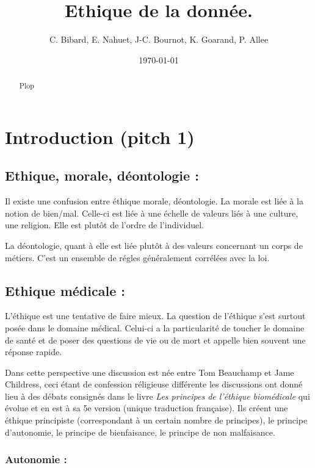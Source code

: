 \documentclass[a4paper,12pt]{article}
\title{Ethique de la donnée.}
\date{\today}
\author{C. Bibard, E. Nahuet, J-C. Bournot, K. Goarand, P. Allee}
\begin{document}
\maketitle

\begin{abstract}
Plop
\end{abstract}


\section{Introduction (pitch 1)}



\subsection{Ethique, morale, déontologie : }

Il existe une confusion entre éthique morale, déontologie. La morale est liée à la notion de bien/mal. Celle-ci est liée à une échelle de valeurs liés à une culture, une religion. Elle est plutôt de l'ordre de l'individuel. 

La déontologie, quant à elle est liée plutôt à des valeurs concernant un corps de métiers. C'est un ensemble de régles généralement corrélées avec la loi. 

\subsection{Ethique médicale :}

L'éthique est une tentative de faire mieux. La question de l'éthique s'est surtout posée dans le domaine médical. Celui-ci a la particularité de toucher le domaine de santé et de poser des questions de vie ou de mort et appelle bien souvent une réponse rapide. 

Dans cette perspective une discussion est née entre Tom Beauchamp et Jame Childress, ceci étant de confession réligieuse différente les discussions ont donné lieu à des débats consignés dans le livre \textit{Les principes de l'éthique biomédicale} qui évolue et en est à sa 5e version (unique traduction française).
Ils créent une éthique principiste (correspondant à un certain nombre de principes), le principe d'autonomie, le principe de bienfaisance, le principe de non malfaisance.

\subsubsection{Autonomie : }
\end{document}
